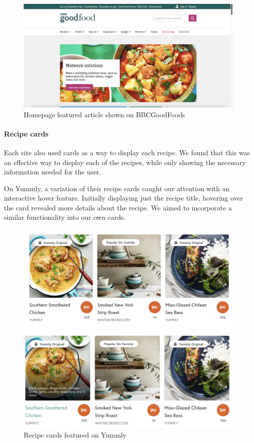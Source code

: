\documentclass{article}
\begin{document}
\begin{figure}[h]
  \includegraphics[width=1.0\textwidth]{assets/design-images/BBCGF featured-image.png}
  \centering
  \caption{Homepage featured article shown on BBCGoodFoods}
\end{figure}

\paragraph{Recipe cards}
Each site also used cards as a way to display each recipe. We found that this was an effective way to display each of the recipes, while only showing the necessary information needed for the user.

On Yummly, a variation of their recipe cards caught our attention with an interactive hover feature. Initially displaying just the recipe title, hovering over the card revealed more details about the recipe. We aimed to incorporate a similar functionality into our own cards.

\begin{figure}[h]
  \includegraphics[width=1.0\textwidth]{assets/design-images/Yummly recipe cards.png}
  \centering
  \caption{Recipe cards featured on Yummly}
\end{figure}
\end{document}
